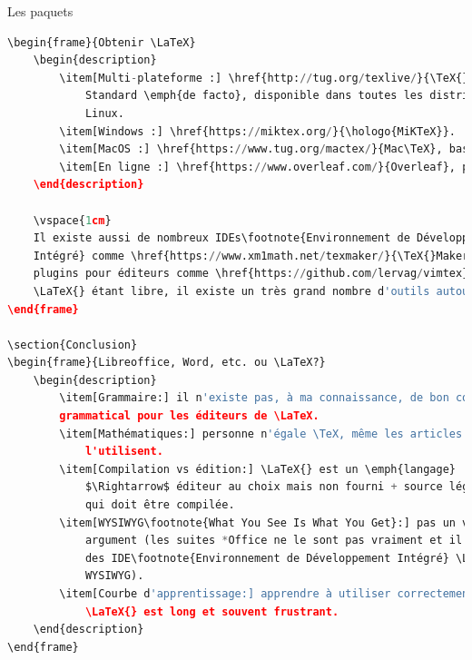 \documentclass[usenames,dvipsnames,10pt]{beamer} %
\begin{document}
\begin{frame}[fragile]{Les paquets}
\begin{description}
{\begin{lstlisting}[language=Python]
\begin{frame}{Obtenir \LaTeX}
    \begin{description}
        \item[Multi-plateforme :] \href{http://tug.org/texlive/}{\TeX{}Live}.
            Standard \emph{de facto}, disponible dans toutes les distribution
            Linux.
        \item[Windows :] \href{https://miktex.org/}{\hologo{MiKTeX}}.
        \item[MacOS :] \href{https://www.tug.org/mactex/}{Mac\TeX}, basé sur \TeX{}Live.
        \item[En ligne :] \href{https://www.overleaf.com/}{Overleaf}, payant avec version d'essai.
    \end{description}

    \vspace{1cm}
    Il existe aussi de nombreux IDEs\footnote{Environnement de Développement
    Intégré} comme \href{https://www.xm1math.net/texmaker/}{\TeX{}Maker} et des
    plugins pour éditeurs comme \href{https://github.com/lervag/vimtex}{vimtex}.
    \LaTeX{} étant libre, il existe un très grand nombre d'outils autour.
\end{frame}

\section{Conclusion}
\begin{frame}{Libreoffice, Word, etc. ou \LaTeX?}
    \begin{description}
        \item[Grammaire:] il n'existe pas, à ma connaissance, de bon correcteur
        grammatical pour les éditeurs de \LaTeX.
        \item[Mathématiques:] personne n'égale \TeX, même les articles wikipedia
            l'utilisent.
        \item[Compilation vs édition:] \LaTeX{} est un \emph{langage}
            $\Rightarrow$ éditeur au choix mais non fourni + source légère mais
            qui doit être compilée.
        \item[WYSIWYG\footnote{What You See Is What You Get}:] pas un vrai
            argument (les suites *Office ne le sont pas vraiment et il existe
            des IDE\footnote{Environnement de Développement Intégré} \LaTeX{}
            WYSIWYG).
        \item[Courbe d'apprentissage:] apprendre à utiliser correctement
            \LaTeX{} est long et souvent frustrant.
    \end{description}
\end{frame}


\end{lstlisting}}
\end{description}
\end{frame}
\end{document}
